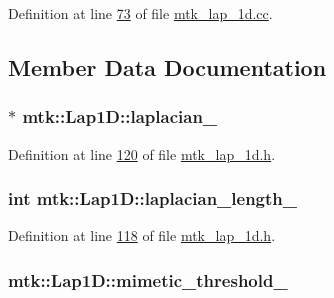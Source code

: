 Definition at line \hyperlink{mtk__lap__1d_8cc_source_l00073}{73} of file \hyperlink{mtk__lap__1d_8cc_source}{mtk\+\_\+lap\+\_\+1d.\+cc}.



\subsection{Member Data Documentation}
\hypertarget{classmtk_1_1Lap1D_a64a3977527c00b4ef994d1bd549f82fd}{
\subsubsection[{laplacian\+\_\+}]{$\ast$ mtk\+::\+Lap1\+D\+::laplacian\+\_\+\hspace{0.3cm}{\ttfamily [private]}}}\label{classmtk_1_1Lap1D_a64a3977527c00b4ef994d1bd549f82fd}


Definition at line \hyperlink{mtk__lap__1d_8h_source_l00120}{120} of file \hyperlink{mtk__lap__1d_8h_source}{mtk\+\_\+lap\+\_\+1d.\+h}.

\hypertarget{classmtk_1_1Lap1D_a05578b0729f2bb4fe8bb442fc555fa80}{
\subsubsection[{laplacian\+\_\+length\+\_\+}]{\setlength{\rightskip}{0pt plus 5cm}int mtk\+::\+Lap1\+D\+::laplacian\+\_\+length\+\_\+\hspace{0.3cm}{\ttfamily [private]}}}\label{classmtk_1_1Lap1D_a05578b0729f2bb4fe8bb442fc555fa80}


Definition at line \hyperlink{mtk__lap__1d_8h_source_l00118}{118} of file \hyperlink{mtk__lap__1d_8h_source}{mtk\+\_\+lap\+\_\+1d.\+h}.

\hypertarget{classmtk_1_1Lap1D_a20dce13067774c64dff892323d9c586e}{
\subsubsection[{mimetic\+\_\+threshold\+\_\+}]{ mtk\+::\+Lap1\+D\+::mimetic\+\_\+threshold\+\_\+\hspace{0.3cm}{\ttfamily [private]}}}\label{classmtk_1_1Lap1D_a20dce13067774c64dff892323d9c586e}


